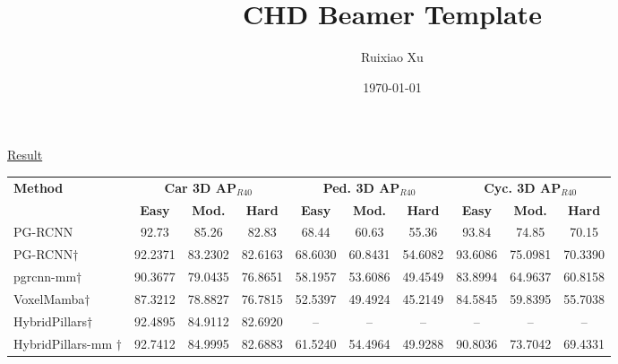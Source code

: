 \documentclass{ctexbeamer}
\title{CHD Beamer Template}
\author{Ruixiao Xu}
\institute{School of Information Engineering\\Chang'an University}
\date{\today}
\begin{document}
\begin{frame}
  \maketitle
\end{frame}

  
\begin{frame}{\underline{Result}}
  \centering
  \begin{adjustbox}{max width=\textwidth}
  \begin{tabular}{l|ccc|ccc|ccc}
      \toprule
      \textbf{Method} & \multicolumn{3}{c|}{\textbf{Car 3D AP$_{R40}$}} & \multicolumn{3}{c|}{\textbf{Ped. 3D AP$_{R40}$}} & \multicolumn{3}{c}{\textbf{Cyc. 3D AP$_{R40}$}} \\
      & \textbf{Easy} & \textbf{Mod.} & \textbf{Hard} & \textbf{Easy} & \textbf{Mod.} & \textbf{Hard} & \textbf{Easy} & \textbf{Mod.} & \textbf{Hard} \\
      \midrule
      PG-RCNN & 92.73 & 85.26 & 82.83 & 68.44 & 60.63 & 55.36 & 93.84 & 74.85 & 70.15 \\
      PG-RCNN$\dagger$ & 92.2371 & 83.2302 & 82.6163 & 68.6030 & 60.8431 & 54.6082 & 93.6086 & 75.0981 & 70.3390 \\
      pgrcnn-mm$\dagger$ & 90.3677 & 79.0435 & 76.8651 & 58.1957 & 53.6086 & 49.4549 & 83.8994 & 64.9637 & 60.8158 \\
      VoxelMamba$\dagger$ & 87.3212 & 78.8827 & 76.7815 & 52.5397 & 49.4924 & 45.2149 & 84.5845 & 59.8395 & 55.7038 \\
      \rowcolor{maroon!10}HybridPillars$\dagger$ & 92.4895 & 84.9112 & 82.6920 & -- & -- & -- & -- & -- & -- \\
      \rowcolor{maroon!10}HybridPillars-mm $\dagger$& 92.7412 & 84.9995 & 82.6883 & 61.5240 & 54.4964 & 49.9288 & 90.8036 & 73.7042 & 69.4331 \\
      \bottomrule
  \end{tabular}
  \end{adjustbox}
\end{frame}
\end{document}
